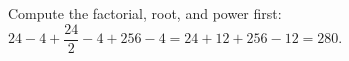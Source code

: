 Compute the factorial, root, and power first: $24-4+\dfrac{24}{2}-4+256-4=24+12+256-12=\boxed{280}$.
